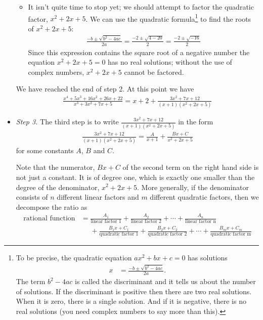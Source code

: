 \begin{eg}
\begin{itemize}
\begin{itemize}
\item It isn't quite time to stop yet; we should attempt to factor the quadratic
factor, $x^2+2x+5$. We can use the quadratic formula\footnote{To be precise, the
quadratic equation $ax^2+bx+c=0$ has solutions
\begin{align*}
  x &= \frac{-b\pm\sqrt{b^2-4ac}}{2a}.
\end{align*}
The term $b^2-4ac$ is called the discriminant and it tells us about the number of
solutions. If the discriminant is positive then there are two real solutions. When it is
zero, there is a single solution. And if it is negative, there is no real solutions (you
need complex numbers to say more than this).} to find the roots of $x^2+2x+5$:
\begin{align*}
\frac{-b\pm\sqrt{b^2-4ac}}{2a}=\frac{-2\pm\sqrt{4-20}}{2}
=\frac{-2\pm\sqrt{-16}}{2}
\end{align*}
Since this expression contains the square root of a negative number the equation
$x^2+2x+5=0$ has no real solutions; without the use of complex numbers, $x^2+2x+5$ cannot
be factored.
\end{itemize}
We have reached the end of step 2. At this point we have
\begin{align*}
\frac{x^4+5x^3+16x^2+26x+22}{x^3+3x^2+7x+5}
=x+2+\frac{3x^2+7x+12}{(x+1)(x^2+2x+5)}
\end{align*}


\item \emph{Step 3.}
The third step is to write $\frac{3x^2+7x+12}{(x+1)(x^2+2x+5)}$
in the form
\begin{align*}
\frac{3x^2+7x+12}{(x+1)(x^2+2x+5)}
=\frac{A}{x+1}+\frac{Bx+C}{x^2+2x+5}
\end{align*}
for some constants $A$, $B$ and $C$.

Note that the numerator, $Bx+C$ of the second term on the right hand side is not
just a constant. It is of degree one,  which is exactly one smaller than the degree
of the denominator, $x^2+2x+5$. More generally, if the denominator consists of
$n$ different linear factors and $m$ different quadratic factors, then we
decompose the ratio as
\begin{align*}
  \text{rational function}
  &= \frac{A_1}{ \text{linear factor 1} }
    +\frac{A_2}{ \text{linear factor 2} } +\cdots
    +\frac{A_n}{ \text{linear factor n} } \\
    &\phantom{=} +
    \frac{B_1x+C_1}{ \text{quadratic factor 1} }
    +\frac{B_2x+C_2}{ \text{quadratic factor 2} } +\cdots
    +\frac{B_mx+C_m}{ \text{quadratic factor m} }
\end{align*}



\end{itemize}
\end{eg}
